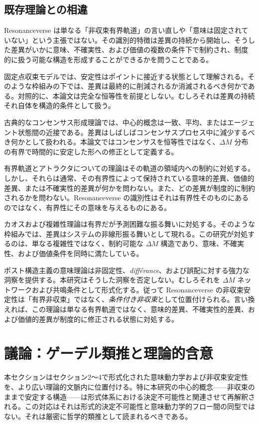 \documentclass[11pt,a4paper]{article}
\theoremstyle{definition}
\begin{document}
\subsection{既存理論との相違}

Resonanceverse は単なる「非収束有界軌道」の言い直しや「意味は固定されていない」という主張ではない。その識別的特徴は差異の持続から開始し、そうした差異がいかに意味、不確実性、および価値の複数の条件下で制約され、制度的に扱う可能な構造を形成することができるかを問うことである。

固定点収束モデルでは、安定性はポイントに接近する状態として理解される。そのような枠組みの下では、差異は最終的に削減されるか消滅されるべき何かである。対照的に、本論文は完全な恒等性を前提としない。むしろそれは差異の持続それ自体を構造的条件として扱う。

古典的なコンセンサス形成理論では、中心的概念は一致、平均、またはエージェント状態間の近接である。差異はしばしばコンセンサスプロセス中に減少するべき何かとして扱われる。本論文ではコンセンサスを恒等性ではなく、$\Delta M$ 分布の有界で時間的に安定した形への修正として定義する。

有界軌道とアトラクタについての理論はその軌道の領域内への制約に対処する。しかし、それらは通常、その有界性によって保持されている意味的差異、価値的差異、または不確実性的差異が何かを問わない。また、どの差異が制度的に制約されるかを問わない。Resonanceverse の識別性はそれは有界性そのものにあるのではなく、有界性にその意味を与えるものにある。

カオスおよび複雑性理論は有界だが予測困難な振る舞いに対処する。そのような枠組みでは、差異はシステムの非線形振る舞いとして現れる。この研究が対処するのは、単なる複雑性ではなく、制約可能な $\Delta M$ 構造であり、意味、不確実性、および価値条件を同時に満たしている。

ポスト構造主義の意味理論は非固定性、\textit{différance}、および誤配に対する強力な洞察を提供する。本研究はそうした洞察を否定しない。むしろそれを $\Delta M$ ネットワークおよび共鳴条件として形式化する。従って Resonanceverse の非収束安定性は「有界非収束」ではなく、\textit{条件付き非収束}として位置付けられる。言い換えれば、この理論は単なる有界軌道ではなく、意味的差異、不確実性的差異、および価値的差異が制度的に修正される状態に対処する。

\section{議論：ゲーデル類推と理論的含意}

本セクションはセクション2～4で形式化された意味動力学および非収束安定性を、より広い理論的文脈内に位置付ける。特に本研究の中心的概念——非収束のままで安定する構造——は形式体系における決定不可能性と関連させて再解釈される。この対応はそれは形式的決定不可能性と意味動力学的フロー間の同型ではない。それは厳密に哲学的類推として読まれるべきである。
\end{document}
